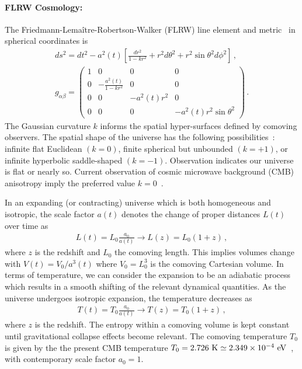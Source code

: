 \paragraph{FLRW Cosmology:} The Friedmann-Lema{\^i}tre-Robertson-Walker (FLRW) line element and metric~\cite{Hobson:2006se,Hartle:2003yu,Misner:1973prb,Weinberg:1972kfs} in spherical coordinates is
\begin{gather}
 \label{FLRW} ds^2=dt^2-a^2(t)\left[\frac{dr^2}{1-kr^{2}}+r^{2}d\theta^2+r^{2}\sin\theta^{2}d\phi^2\right]\,,\\[0.3cm]
 g_{\alpha\beta}=
 \begin{pmatrix}
 1&0&0&0\\
 0&-\displaystyle\frac{a^{2}(t)}{1-kr^{2}}&0&0\\
 0&0&-a^{2}(t)r^{2}&0\\
 0&0&0&-a^{2}(t)r^{2}\sin\theta^{2}
 \end{pmatrix}\,.
\end{gather}
The Gaussian curvature $k$ informs the spatial hyper-surfaces defined by comoving observers. The spatial shape of the universe has the following possibilities~\cite{Planck:2018vyg}: infinite flat Euclidean $(k=0)$, finite spherical but unbounded $(k=+1)$, or infinite hyperbolic saddle-shaped $(k=-1)$. Observation indicates our universe is flat or nearly so. Current observation of cosmic microwave background (CMB) anisotropy imply the preferred value $k=0$~\cite{Planck:2018vyg,Planck:2015fie,Planck:2013pxb}.

In an expanding (or contracting) universe which is both homogeneous and isotropic, the scale factor $a(t)$ denotes the change of proper distances $L(t)$ over time as
\begin{gather}
 L(t)=L_{0}\frac{a_{0}}{a(t)}\rightarrow L(z)=L_{0}(1+z)\,,
\end{gather}
where $z$ is the redshift and $L_{0}$ the comoving length. This implies volumes change with $V(t)=V_{0}/a^{3}(t)$ where $V_{0}=L_{0}^{3}$ is the comoving Cartesian volume. In terms of temperature, we can consider the expansion to be an adiabatic process~\cite{Abdalla:2022yfr} which results in a smooth shifting of the relevant dynamical quantities. As the universe undergoes isotropic expansion, the temperature decreases as 
\begin{gather}
 \label{tscale}
 T(t)=T_{0}\frac{a_{0}}{a(t)}\rightarrow T(z)=T_{0}(1+z)\,,
\end{gather}
where $z$ is the redshift. The entropy within a comoving volume is kept constant until gravitational collapse effects become relevant. The comoving temperature $T_{0}$ is given by the the present CMB temperature $T_{0}=2.726{\rm\ K}\simeq 2.349\times10^{-4}\text{ eV}$~\cite{Planck:2018vyg}, with contemporary scale factor $a_{0}=1$.

